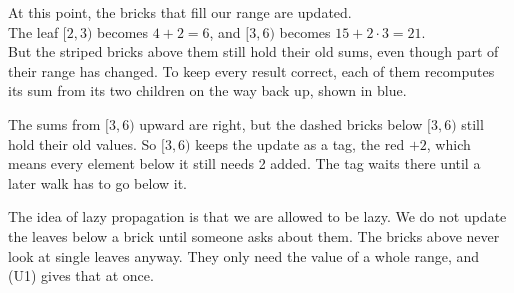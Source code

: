 At this point, the bricks that fill our range are updated. \\
The leaf \([2, 3)\) becomes \(4 + 2 = 6\), and \([3, 6)\) becomes \(15 + 2 \cdot 3 = 21\). \\
But the striped bricks above them still hold their old sums, even though part of their range has changed. To keep every result correct, each of them recomputes its sum from its two children on the way back up, shown in blue.

\begin{center}
\end{center}
The sums from \([3, 6)\) upward are right, but the dashed bricks below \([3, 6)\) still hold their old values. So \([3, 6)\) keeps the update as a tag, the red \(+2\), which means every element below it still needs 2 added. The tag waits there until a later walk has to go below it.

The idea of lazy propagation is that we are allowed to be lazy. We do not update the leaves below a brick until someone asks about them. The bricks above never look at single leaves anyway. They only need the value of a whole range, and \textup{(U1)} gives that at once.

